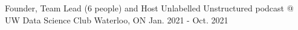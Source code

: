

\begin{cvposition}

  \cvhonor
    {Founder, Team Lead (6 people) and Host} %
    {Unlabelled Unstructured podcast @ UW Data Science Club} %
    {Waterloo, ON} %
    {Jan. 2021 - Oct. 2021} %




\end{cvposition}
